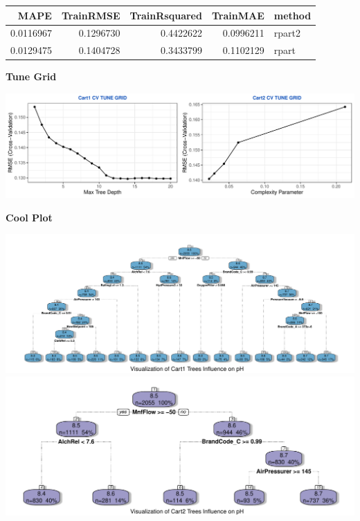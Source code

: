 \documentclass[]{report}
\begin{document}
\begin{table}[H]
\centering\begingroup\fontsize{8}{10}\selectfont

\begin{tabular}{r|r|r|r|l}
\hline
MAPE & TrainRMSE & TrainRsquared & TrainMAE & method\\
\hline
\rowcolor{gray!6}  0.0116967 & 0.1296730 & 0.4422622 & 0.0996211 & rpart2\\
\hline
0.0129475 & 0.1404728 & 0.3433799 & 0.1102129 & rpart\\
\hline
\end{tabular}
\endgroup{}
\end{table}

\textbf{Tune Grid}

\includegraphics{Group2_Project2_Fall2019_files/figure-latex/unnamed-chunk-4-1.pdf}

\textbf{Cool Plot}

\includegraphics{Group2_Project2_Fall2019_files/figure-latex/unnamed-chunk-5-1.pdf}
\includegraphics{Group2_Project2_Fall2019_files/figure-latex/unnamed-chunk-5-2.pdf}
\end{document}
